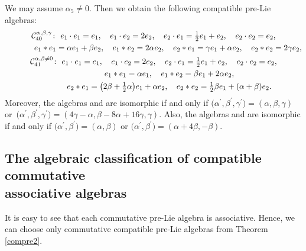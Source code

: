 \documentclass[10pt,a4paper]{amsart}
\numberwithin{equation}{section}
\begin{document}
We may assume $\alpha _{5}\neq 0$. Then we obtain the following compatible
pre-Lie algebras:
\begin{gather*}
\mathcal{C}_{40}^{\alpha ,\beta ,\gamma } \colon \
e_{1}\cdot e_{1}=e_{1}, \quad e_{1}\cdot e_{2}=2e_{2} , \quad e_{2}\cdot e_{1}=%
\tfrac{1}{2}e_{1}+e_{2},\quad e_{2}\cdot e_{2}=e_{2} , \\
\hphantom{\mathcal{C}_{40}^{\alpha ,\beta ,\gamma } \colon} \
e_{1}\ast e_{1}=\alpha e_{1}+\beta e_{2} , \quad e_{1}\ast e_{2}=2\alpha e_{2},
 \quad e_{2}\ast e_{1}=\gamma e_{1}+\alpha e_{2} , \quad e_{2}\ast e_{2}=2\gamma
e_{2},\\
\mathcal{C}_{41}^{\alpha ,\beta \neq 0} \colon \
 e_{1}\cdot e_{1}=e_{1} , \quad e_{1}\cdot e_{2}=2e_{2} , \quad e_{2}\cdot e_{1}=%
\tfrac{1}{2}e_{1}+e_{2} , \quad e_{2}\cdot e_{2}=e_{2} , \\
\hphantom{\mathcal{C}_{41}^{\alpha ,\beta \neq 0} \colon} \
 e_{1}\ast e_{1}=\alpha e_{1} ,\quad
 e_{1}\ast e_{2}=\beta e_{1}+2\alpha e_{2},
 \\
\hphantom{\mathcal{C}_{41}^{\alpha ,\beta \neq 0} \colon} \
 e_{2}\ast e_{1}=\bigl( 2\beta +\tfrac{1}{2}\alpha \bigr) e_{1}+\alpha
e_{2} , \quad e_{2}\ast e_{2}=\tfrac{1}{2}\beta e_{1}+( \alpha +\beta
) e_{2}.
\end{gather*}
Moreover, the algebras  and \smash{$\mathcal{C}%
_{40}^{\alpha ^{\prime },\beta ^{\prime },\gamma ^{\prime }}$} are isomorphic
if and only if
$\bigl( \alpha ^{\prime },\beta ^{\prime },\gamma ^{\prime
}\bigr) =( \alpha ,\beta ,\gamma )$ or~${\bigl( \alpha ^{\prime
},\beta ^{\prime },\gamma ^{\prime }\bigr) =( 4\gamma -\alpha ,\beta
-8\alpha +16\gamma ,\gamma )}$.
Also, the algebras \smash{$\mathcal{C}%
_{41}^{\alpha ,\beta }$} and 
are isomorphic if and only if
$
\bigl( \alpha ^{\prime },\beta ^{\prime
}\bigr) =( \alpha ,\beta ) $ or $\bigl( \alpha ^{\prime },\beta
^{\prime }\bigr) =( \alpha +4\beta ,-\beta )$.



\subsection[The algebraic classification of compatible commutative associative algebras]{The algebraic classification of compatible commutative\\ associative algebras}
It is easy to see that each commutative pre-Lie algebra is associative.
Hence, we can choose only commutative compatible pre-Lie algebras from Theorem \ref{compre2}.
\end{document}

